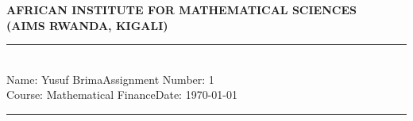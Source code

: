 \documentclass[12pt,a4paper]{article}
\newcommand{\student}{Yusuf Brima}
\newcommand{\course}{Mathematical Finance}
\newcommand{\assignment}{1}
\begin{document}
\thispagestyle{empty}
\begin{center}
\textbf{AFRICAN INSTITUTE FOR MATHEMATICAL SCIENCES \\[0.5cm]
(AIMS RWANDA, KIGALI)}
\vspace{1.0cm}
\end{center}

\noindent
\rule{17cm}{0.2cm}\\[0.3cm]
Name: \student \hfill Assignment Number: \assignment\\[0.1cm]
Course: \course \hfill Date: \today\\
\rule{17cm}{0.05cm}
\vspace{1.0cm}
\end{document}
